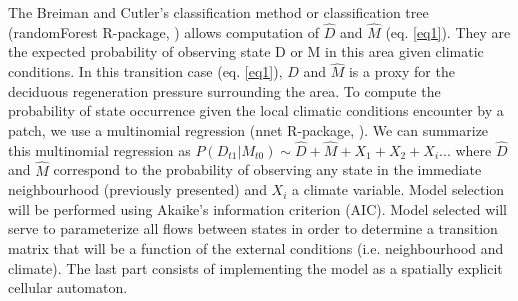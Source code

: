 The Breiman and Cutler's classification method or classification tree
(randomForest R-package, \cite{Liaw2002a}) allows computation of $\hat{D}$ and
$\hat{M}$ (eq. \ref{eq1}). They are the expected probability of observing
state D or M in this area given climatic conditions. In this transition case
(eq. \ref{eq1}), $\hat{D}$ and $\hat{M}$ is a proxy for the deciduous
regeneration pressure surrounding the area. To compute the probability of
state occurrence given the local climatic conditions encounter by a patch, we
use a multinomial regression (nnet R-package, \cite{Venables2002}). We can
summarize this multinomial regression as $P(D_{t1}|M_{t0}) \sim \hat{D} +
\hat{M} + X_1+X_2+X_i... $ where $\hat{D}$ and $\hat{M}$ correspond to the
probability of observing any state in the immediate neighbourhood (previously
presented) and $X_i$ a climate variable. Model selection will be performed using
Akaike's information criterion (AIC). Model selected will serve to parameterize
all flows between states in order to determine a transition matrix that will
be a function of the external conditions (i.e. neighbourhood and climate). 
%
The last part consists of implementing the model as a spatially explicit cellular
automaton. %


